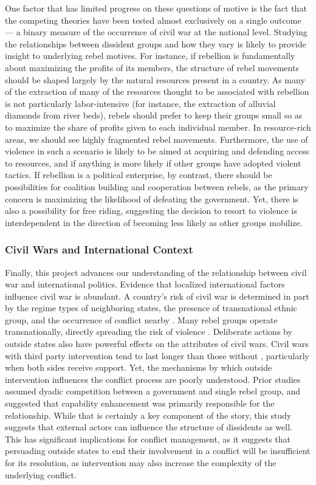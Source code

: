 One factor that has limited progress on these questions of motive is the fact that the competing theories have been tested almost exclusively on a single outcome --- a binary measure of the occurrence of civil war at the national level. Studying the relationships between dissident groups and how they vary is likely to provide insight to underlying rebel motives. For instance, if rebellion is fundamentally about maximizing the profits of its members, the structure of rebel movements should be shaped largely by the natural resources present in a country. As many of the extraction of many of the resources thought to be associated with rebellion is not particularly labor-intensive (for instance, the extraction of alluvial diamonds from river beds), rebels should prefer to keep their groups small so as to maximize the share of profits given to each individual member. In resource-rich areas, we should see highly fragmented rebel movements. Furthermore, the use of violence in such a scenario is likely to be aimed at acquiring and defending access to resources, and if anything is more likely if other groups have adopted violent tactics. If rebellion is a political enterprise, by contrast, there should be possibilities for coalition building and cooperation between rebels, as the primary concern is maximizing the likelihood of defeating the government. Yet, there is also a possibility for free riding, suggesting the decision to resort to violence is interdependent in the direction of becoming less likely as other groups mobilize.

\subsubsection{Civil Wars and International Context}

Finally, this project advances our understanding of the relationship between civil war and international politics. Evidence that localized international factors influence civil war is abundant. A country's risk of civil war is determined in part by the regime types of neighboring states, the presence of transnational ethnic group, and the occurrence of conflict nearby \citep{Gleditsch2007}. Many rebel groups operate transnationally, directly spreading the risk of violence \citep{salehyan07}. Deliberate actions by outside states also have powerful effects on the attributes of civil wars. Civil wars with third party intervention tend to last longer than those without \citep{Balch-Lindsay2000,Regan2002}, particularly when both sides receive support. Yet, the mechanisms by which outside intervention influences the conflict process are poorly understood. Prior studies assumed dyadic competition between a government and single rebel group, and suggested that capability enhancement was primarily responsible for the relationship. While that is certainly a key component of the story, this study suggests that external actors can influence the structure of dissidents as well. This has significant implications for conflict management, as it suggests that persuading outside states to end their involvement in a conflict will be insufficient for its resolution, as intervention may also increase the complexity of the underlying conflict.

